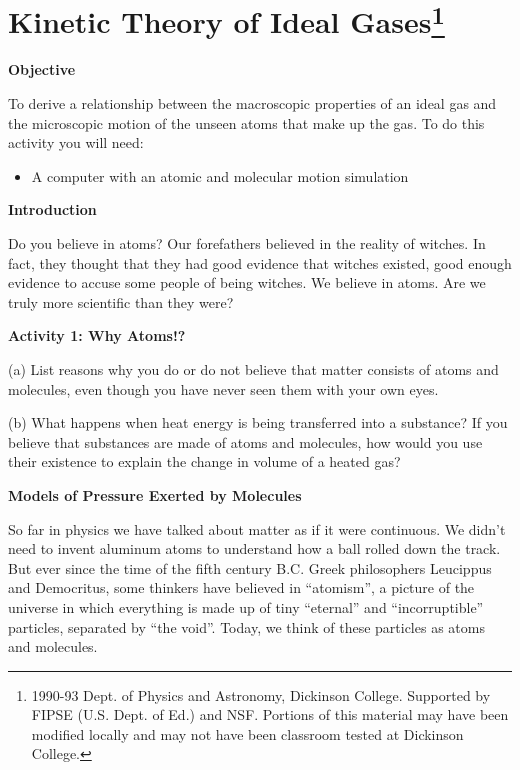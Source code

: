 
\section{Kinetic Theory of Ideal Gases\footnote{%
1990-93 Dept. of Physics and Astronomy, Dickinson College. Supported
by FIPSE (U.S. Dept. of Ed.) and NSF. Portions of this material may
have been modified locally and may not have been classroom tested
at Dickinson College.
}}

\makelabheader %

\textbf{Objective} 

To derive a relationship between the macroscopic properties of an
ideal gas and the microscopic motion of the unseen atoms that make
up the gas. To do this activity you will need:

\begin{itemize}
\item A computer with an atomic and molecular motion simulation
\end{itemize}
\textbf{Introduction}

Do you believe in atoms? Our forefathers believed in the reality of
witches. In fact, they thought that they had good evidence that witches
existed, good enough evidence to accuse some people of being witches.
We believe in atoms. Are we truly more scientific than they were?

\textbf{Activity 1: Why Atoms!?}

(a) List reasons why you do or do not believe that matter consists
of atoms and molecules, even though you have never seen them with
your own eyes.
\vspace{20mm}

(b) What happens when heat energy is being transferred into a substance?
If you believe that substances are made of atoms and molecules, how
would you use their existence to explain the change in volume of a
heated gas?
\vspace{20mm}

\textbf{Models of Pressure Exerted by Molecules}

So far in physics we have talked about matter as if it were continuous.
We didn't need to invent aluminum atoms to understand how a ball rolled
down the track. But ever since the time of the fifth century B.C.
Greek philosophers Leucippus and Democritus, some thinkers have believed
in {}``atomism'', a picture of the universe in which everything
is made up of tiny {}``eternal'' and {}``incorruptible'' particles,
separated by {}``the void''. Today, we think of these particles
as atoms and molecules.

